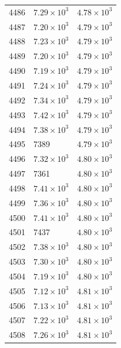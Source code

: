 \begin{table}[H]
\begin{tabular}{lll}
4486 & $\displaystyle 7.29 \times 10^{3}$ & $\displaystyle 4.78 \times 10^{3}$ \\
4487 & $\displaystyle 7.20 \times 10^{3}$ & $\displaystyle 4.79 \times 10^{3}$ \\
4488 & $\displaystyle 7.23 \times 10^{3}$ & $\displaystyle 4.79 \times 10^{3}$ \\
4489 & $\displaystyle 7.20 \times 10^{3}$ & $\displaystyle 4.79 \times 10^{3}$ \\
4490 & $\displaystyle 7.19 \times 10^{3}$ & $\displaystyle 4.79 \times 10^{3}$ \\
4491 & $\displaystyle 7.24 \times 10^{3}$ & $\displaystyle 4.79 \times 10^{3}$ \\
4492 & $\displaystyle 7.34 \times 10^{3}$ & $\displaystyle 4.79 \times 10^{3}$ \\
4493 & $\displaystyle 7.42 \times 10^{3}$ & $\displaystyle 4.79 \times 10^{3}$ \\
4494 & $\displaystyle 7.38 \times 10^{3}$ & $\displaystyle 4.79 \times 10^{3}$ \\
4495 & 7389 & $\displaystyle 4.79 \times 10^{3}$ \\
4496 & $\displaystyle 7.32 \times 10^{3}$ & $\displaystyle 4.80 \times 10^{3}$ \\
4497 & 7361 & $\displaystyle 4.80 \times 10^{3}$ \\
4498 & $\displaystyle 7.41 \times 10^{3}$ & $\displaystyle 4.80 \times 10^{3}$ \\
4499 & $\displaystyle 7.36 \times 10^{3}$ & $\displaystyle 4.80 \times 10^{3}$ \\
4500 & $\displaystyle 7.41 \times 10^{3}$ & $\displaystyle 4.80 \times 10^{3}$ \\
4501 & 7437 & $\displaystyle 4.80 \times 10^{3}$ \\
4502 & $\displaystyle 7.38 \times 10^{3}$ & $\displaystyle 4.80 \times 10^{3}$ \\
4503 & $\displaystyle 7.30 \times 10^{3}$ & $\displaystyle 4.80 \times 10^{3}$ \\
4504 & $\displaystyle 7.19 \times 10^{3}$ & $\displaystyle 4.80 \times 10^{3}$ \\
4505 & $\displaystyle 7.12 \times 10^{3}$ & $\displaystyle 4.81 \times 10^{3}$ \\
4506 & $\displaystyle 7.13 \times 10^{3}$ & $\displaystyle 4.81 \times 10^{3}$ \\
4507 & $\displaystyle 7.22 \times 10^{3}$ & $\displaystyle 4.81 \times 10^{3}$ \\
4508 & $\displaystyle 7.26 \times 10^{3}$ & $\displaystyle 4.81 \times 10^{3}$ \\

\end{tabular}
\end{table}
